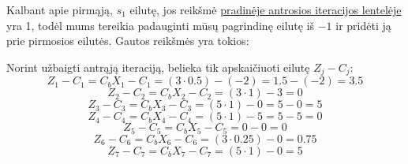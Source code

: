 \documentclass{article}
\begin{document}
Kalbant apie pirmąją, $s_1$ eilutę, jos reikšmė \hyperref[table:2]{pradinėje antrosios iteracijos lentelėje} yra 1, todėl mums tereikia padauginti mūsų pagrindinę eilutę iš $-1$ ir pridėti ją prie pirmosios eilutės. Gautos reikšmės yra tokios: 
\begin{table}[H]
    \centering
\end{table}
Norint užbaigti antrąją iteraciją, belieka tik apskaičiuoti eilutę $Z_j-C_j$:
\begin{equation*}
    Z_1-C_1=C_bX_1-C_1=(3\cdot0.5)-(-2)=1.5-(-2)=3.5
\end{equation*}
\begin{equation*}
    Z_2-C_2=C_bX_2-C_2=(3\cdot1)-3=0
\end{equation*}
\begin{equation*}
    Z_3-C_3=C_bX_3-C_3=(5\cdot1)-0=5-0=5
\end{equation*}
\begin{equation*}
    Z_4-C_4=C_bX_4-C_4=(5\cdot1)-5=5-5=0
\end{equation*}
\begin{equation*}
    Z_5-C_5=C_bX_5-C_5=0-0=0
\end{equation*}
\begin{equation*}
    Z_6-C_6=C_bX_6-C_6=(3\cdot0.25)-0=0.75
\end{equation*}
\begin{equation*}
    Z_7-C_7=C_bX_7-C_7=(5\cdot1)-0=5
\end{equation*}
\end{document}
